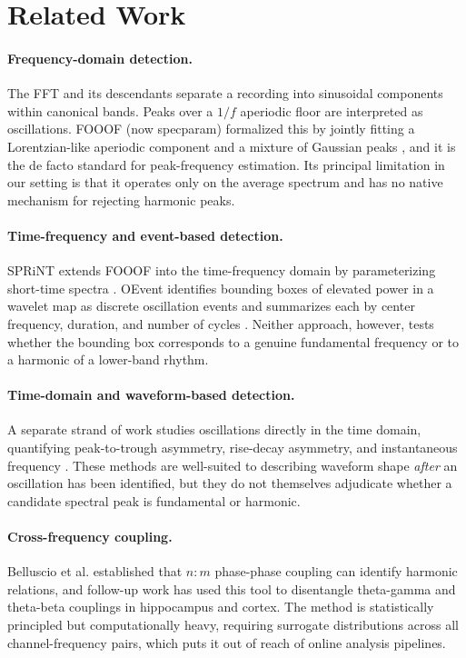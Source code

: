 \section{Related Work}
\label{sec:relwork}

\paragraph{Frequency-domain detection.} The FFT and its descendants separate a recording into sinusoidal components within canonical bands. Peaks over a $1/f$ aperiodic floor are interpreted as oscillations. FOOOF (now specparam) formalized this by jointly fitting a Lorentzian-like aperiodic component and a mixture of Gaussian peaks \citep{donoghue2020parameterizing}, and it is the de facto standard for peak-frequency estimation. Its principal limitation in our setting is that it operates only on the average spectrum and has no native mechanism for rejecting harmonic peaks.

\paragraph{Time-frequency and event-based detection.} SPRiNT extends FOOOF into the time-frequency domain by parameterizing short-time spectra \citep{wilson2022sprint}. OEvent identifies bounding boxes of elevated power in a wavelet map as discrete oscillation events and summarizes each by center frequency, duration, and number of cycles \citep{neymotin2022oevent}. Neither approach, however, tests whether the bounding box corresponds to a genuine fundamental frequency or to a harmonic of a lower-band rhythm.

\paragraph{Time-domain and waveform-based detection.} A separate strand of work studies oscillations directly in the time domain, quantifying peak-to-trough asymmetry, rise-decay asymmetry, and instantaneous frequency \citep{cole2017waveform,cole2019cycle,quinn2021within,gips2017lineclock}. These methods are well-suited to describing waveform shape \emph{after} an oscillation has been identified, but they do not themselves adjudicate whether a candidate spectral peak is fundamental or harmonic.

\paragraph{Cross-frequency coupling.} Belluscio et al. \citep{belluscio2012crossfrequency} established that $n{:}m$ phase-phase coupling can identify harmonic relations, and follow-up work has used this tool to disentangle theta-gamma and theta-beta couplings in hippocampus and cortex. The method is statistically principled but computationally heavy, requiring surrogate distributions across all channel-frequency pairs, which puts it out of reach of online analysis pipelines.

